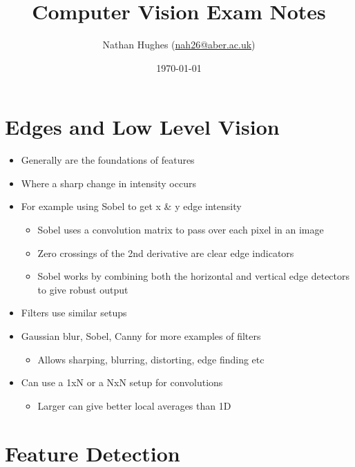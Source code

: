 \documentclass[a4paper]{article}
\author{Nathan Hughes (\href{mailto:nah31@aber.ac.uk}{nah26@aber.ac.uk})}
\date{\today}
\title{Computer Vision Exam Notes}
\begin{document}
\maketitle
\maketitle


\section{Edges and Low Level Vision}
\label{sec-1}

\begin{itemize}
\item Generally are the foundations of features
\item Where a sharp change in intensity occurs
\item For example using Sobel to get x \& y edge intensity
\begin{itemize}
\item Sobel uses a convolution matrix to pass over each pixel in an image
\item Zero crossings of the 2nd derivative are clear edge indicators
\item Sobel works by combining both the horizontal and vertical edge detectors to give robust output
\end{itemize}
\item Filters use similar setups
\item Gaussian blur, Sobel, Canny for more examples of filters
\begin{itemize}
\item Allows sharping, blurring, distorting, edge finding etc
\end{itemize}
\item Can use a 1xN or a NxN setup for convolutions
\begin{itemize}
\item Larger can give better local averages than 1D
\end{itemize}
\end{itemize}

\section{Feature Detection}
\label{sec-2}
\end{document}
